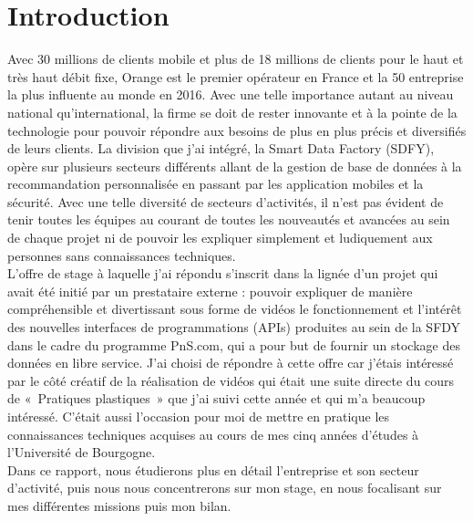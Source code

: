\chapter*{Introduction}
\label{chap:introduction}

Avec 30 millions de clients mobile et plus de 18 millions de clients  pour le haut et très haut débit fixe, Orange est le premier opérateur en France et la 50 entreprise la plus influente au monde en 2016. Avec une telle importance autant au niveau national qu'international, la firme se doit de rester innovante et à la pointe de la technologie pour pouvoir répondre aux besoins de plus en plus précis et diversifiés de leurs clients. La division que j’ai intégré, la Smart Data Factory (SDFY), opère sur plusieurs secteurs différents allant de la gestion de base de données à la recommandation personnalisée en passant par les application mobiles et la sécurité. Avec une telle diversité de secteurs d’activités, il n’est pas évident de tenir toutes les équipes au courant de toutes les nouveautés et avancées au sein de chaque projet ni de pouvoir les expliquer simplement et ludiquement aux personnes sans connaissances techniques.\\
L’offre de stage à laquelle j’ai répondu s’inscrit dans la lignée d’un projet qui avait été initié par un prestataire externe : pouvoir expliquer de manière compréhensible et divertissant sous forme de vidéos le fonctionnement et l’intérêt des nouvelles  interfaces de programmations (APIs) produites au sein de la SFDY dans le cadre du programme PnS.com, qui a pour but de fournir un stockage des données en libre service. J’ai choisi de répondre à cette offre car j’étais intéressé par le côté créatif de la réalisation de vidéos qui était une suite directe du cours de « Pratiques plastiques » que j’ai suivi cette année et qui m’a beaucoup intéressé. C’était aussi l’occasion pour moi de mettre en pratique les connaissances techniques acquises au cours de mes cinq années d'études à l’Université de Bourgogne.\\
Dans ce rapport, nous étudierons plus en détail l’entreprise et son secteur d’activité, puis nous nous concentrerons sur mon stage, en nous focalisant sur mes différentes missions puis mon bilan.
